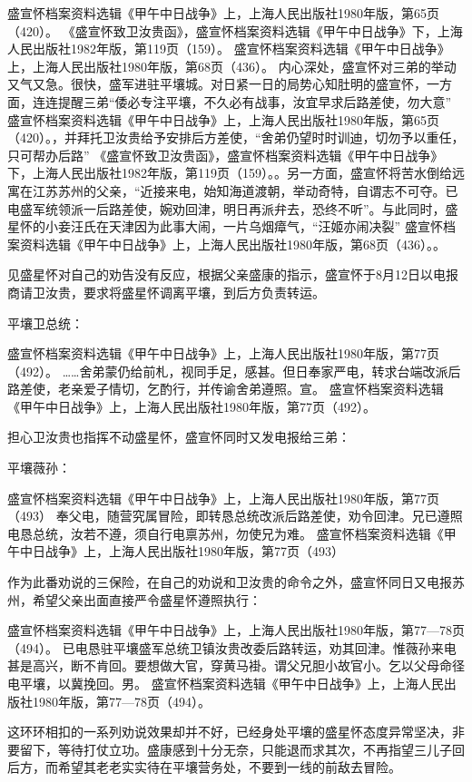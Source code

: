 \documentclass[12pt,UTF8]{ctexbook}
\begin{document}
盛宣怀档案资料选辑《甲午中日战争》上，上海人民出版社1980年版，第65页（420）。
《盛宣怀致卫汝贵函》，盛宣怀档案资料选辑《甲午中日战争》下，上海人民出版社1982年版，第119页（159）。
盛宣怀档案资料选辑《甲午中日战争》上，上海人民出版社1980年版，第68页（436）。
内心深处，盛宣怀对三弟的举动又气又急。很快，盛军进驻平壤城。对日紧一日的局势心知肚明的盛宣怀，一方面，连连提醒三弟“倭必专注平壤，不久必有战事，汝宜早求后路差使，勿大意” 盛宣怀档案资料选辑《甲午中日战争》上，上海人民出版社1980年版，第65页（420）。，并拜托卫汝贵给予安排后方差使，“舍弟仍望时时训迪，切勿予以重任，只可帮办后路” 《盛宣怀致卫汝贵函》，盛宣怀档案资料选辑《甲午中日战争》下，上海人民出版社1982年版，第119页（159）。。另一方面，盛宣怀将苦水倒给远寓在江苏苏州的父亲，“近接来电，始知海道渡朝，举动奇特，自谓志不可夺。已电盛军统领派一后路差使，婉劝回津，明日再派弁去，恐终不听”。与此同时，盛星怀的小妾汪氏在天津因为此事大闹，一片乌烟瘴气，“汪姬亦闹决裂” 盛宣怀档案资料选辑《甲午中日战争》上，上海人民出版社1980年版，第68页（436）。。

见盛星怀对自己的劝告没有反应，根据父亲盛康的指示，盛宣怀于8月12日以电报商请卫汝贵，要求将盛星怀调离平壤，到后方负责转运。

平壤卫总统：

盛宣怀档案资料选辑《甲午中日战争》上，上海人民出版社1980年版，第77页（492）。
……舍弟蒙仍给前札，视同手足，感甚。但日奉家严电，转求台端改派后路差使，老亲爱子情切，乞酌行，并传谕舍弟遵照。宣。 盛宣怀档案资料选辑《甲午中日战争》上，上海人民出版社1980年版，第77页（492）。

担心卫汝贵也指挥不动盛星怀，盛宣怀同时又发电报给三弟：

平壤薇孙：

盛宣怀档案资料选辑《甲午中日战争》上，上海人民出版社1980年版，第77页（493）
奉父电，随营究属冒险，即转恳总统改派后路差使，劝令回津。兄已遵照电恳总统，汝若不遵，须自行电禀苏州，勿使兄为难。 盛宣怀档案资料选辑《甲午中日战争》上，上海人民出版社1980年版，第77页（493）

作为此番劝说的三保险，在自己的劝说和卫汝贵的命令之外，盛宣怀同日又电报苏州，希望父亲出面直接严令盛星怀遵照执行：

盛宣怀档案资料选辑《甲午中日战争》上，上海人民出版社1980年版，第77—78页（494）。
已电恳驻平壤盛军总统卫镇汝贵改委后路转运，劝其回津。惟薇孙来电甚是高兴，断不肯回。要想做大官，穿黄马褂。谓父兄胆小故官小。乞以父母命径电平壤，以冀挽回。男。 盛宣怀档案资料选辑《甲午中日战争》上，上海人民出版社1980年版，第77—78页（494）。

这环环相扣的一系列劝说效果却并不好，已经身处平壤的盛星怀态度异常坚决，非要留下，等待打仗立功。盛康感到十分无奈，只能退而求其次，不再指望三儿子回后方，而希望其老老实实待在平壤营务处，不要到一线的前敌去冒险。
\end{document}
